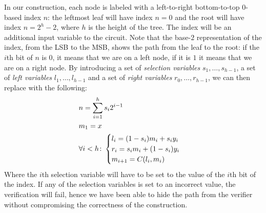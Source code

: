 In our construction, each node is labeled with a left-to-right bottom-to-top \(0\)-based index 
\(n\): the leftmost leaf will have index \(n = 0\) and the root will have index \(n = 2^{h} - 2\), 
where \(h\) is the height of the tree. 
The index will be an additional input variable to the circuit. 
Note that the base-\(2\) representation of the index, from the LSB to the MSB, shows the path from 
the leaf to the root: if the \(i\)th bit of \(n\) is \(0\), it means that we are on a left node, if 
it is \(1\) it means that we are on a right node.
By introducing a set of \emph{selection variables} \(s_1, \dots, s_{h-1}\), a set of 
\emph{left variables} \(l_1, \dots, l_{h-1}\) and a set of \emph{right variables} 
\(r_0, \dots, r_{h-1}\), we can then replace  with the following:
\begin{align*}
  & n = \sum_{i=1}^{h}{s_{i}2^{i-1}} \\
  & m_1 = x \\
  & \forall i < h\colon
  \begin{cases}  
    l_i = \Parens*{1 - s_{i}}m_{i} + s_{i}y_{i} \\ 
    r_i = s_{i}m_{i} + \Parens*{1 - s_{i}}y_{i} \\
    m_{i+1} = \call{C}{l_i, m_i}
  \end{cases}
\end{align*}
Where the \(i\)th selection variable will have to be set to the value of the \(i\)th bit of the 
index. If any of the selection variables is set to an incorrect value, the verification will 
fail, hence we have been able to hide the path from the verifier without compromising the 
correctness of the construction.

